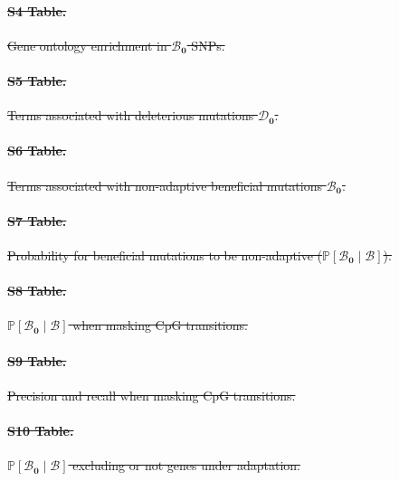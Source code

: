 \documentclass[10pt,letterpaper]{article}
\newcommand{\proba}{\mathbb{P}}
\newcommand{\SphyDel}{\mathcal{D}_0}
\newcommand{\SphyBen}{\mathcal{B}_0}
\newcommand{\given}{\mid}
\newcommand{\SpopBen}{\mathcal{B}}
\providecommand{\DIFdeltex}[1]{{\protect\color{red}\sout{#1}}}                      %
\providecommand{\DIFdel}[1]{\texorpdfstring{\DIFdeltex{#1}}{}} %
\begin{document}
\paragraph*{\DIFdel{S4 Table.}}
\DIFdel{Gene ontology enrichment in $\bm{\SphyBen}$ SNPs.}%

\paragraph*{\DIFdel{S5 Table.}}
\DIFdel{Terms associated with deleterious mutations $\bm{\SphyDel}$.}%

\paragraph*{\DIFdel{S6 Table.}}
\DIFdel{Terms associated with non-adaptive beneficial mutations $\bm{\SphyBen}$.}%

\paragraph*{\DIFdel{S7 Table.}}
\DIFdel{Probability for beneficial mutations to be non-adaptive ($\bm{\proba[\SphyBen\given \SpopBen ]}$).}%

\paragraph*{\DIFdel{S8 Table.}}
\DIFdel{$\bm{\proba[\SphyBen\given \SpopBen ]}$ when masking CpG transitions.}%

\paragraph*{\DIFdel{S9 Table.}}
\DIFdel{Precision and recall when masking CpG transitions.}%

\paragraph*{\DIFdel{S10 Table.}}
\DIFdel{$\bm{\proba[\SphyBen\given \SpopBen ]}$ excluding or not genes under adaptation.}%
\end{document}
